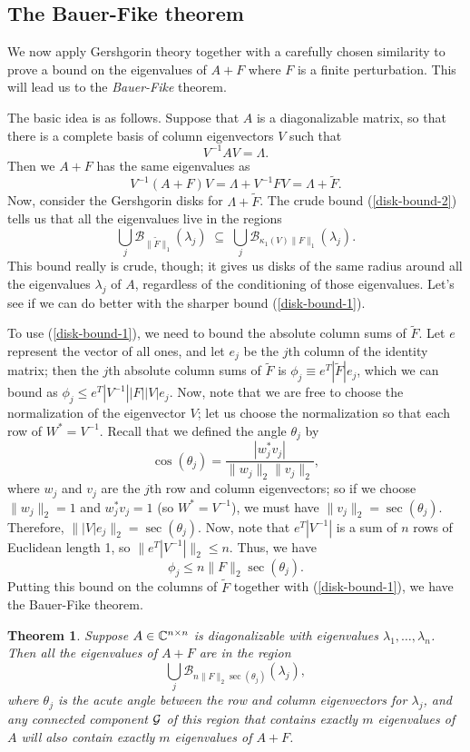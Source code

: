 \documentclass[12pt, leqno]{article} %
\newcommand{\calB}{\mathcal{B}}
\newtheorem{theorem}{Theorem}
\begin{document}
\subsection{The Bauer-Fike theorem}

We now apply Gershgorin theory together with a carefully chosen
similarity to prove a bound on the eigenvalues of $A+F$ where $F$ is a
finite perturbation.  This will lead us to the {\em Bauer-Fike} theorem.

The basic idea is as follows.  Suppose that $A$ is a diagonalizable matrix, so
that there is a complete basis of column eigenvectors $V$ such that
\[
  V^{-1} A V = \Lambda.
\]
Then we $A+F$ has the same eigenvalues as
\[
  V^{-1} (A+F) V = \Lambda + V^{-1} F V = \Lambda + \tilde{F}.
\]
Now, consider the Gershgorin disks for $\Lambda + \tilde{F}$.
The crude bound (\ref{disk-bound-2}) tells us
that all the eigenvalues live in the regions
\[
  \bigcup_j \calB_{\|\tilde{F}\|_1}(\lambda_j) \; \subseteq \;
  \bigcup_j \calB_{\kappa_1(V) \|F\|_1}(\lambda_j).
\]
This bound really is crude, though; it gives us disks of the
same radius around all the eigenvalues $\lambda_j$ of $A$,
regardless of the conditioning of those eigenvalues.  Let's
see if we can do better with the sharper bound (\ref{disk-bound-1}).

To use (\ref{disk-bound-1}), we need to bound
the absolute column sums of $\tilde{F}$.  Let $e$ represent
the vector of all ones, and let $e_j$ be the $j$th column of
the identity matrix; then the $j$th absolute column sums of $\tilde{F}$
is $\phi_j \equiv e^T |\tilde{F}| e_j$, which we can bound
as $\phi_j \leq e^T |V^{-1}| |F| |V| e_j$.  Now, note that we
are free to choose the normalization of the eigenvector $V$;
let us choose the normalization so that each row of $W^* = V^{-1}$.
Recall that we defined the angle $\theta_j$ by
\[
  \cos(\theta_j) = \frac{|w_j^* v_j|}{\|w_j\|_2 \|v_j\|_2},
\]
where $w_j$ and $v_j$ are the $j$th row and column eigenvectors;
so if we choose $\|w_j\|_2 = 1$ and $w_j^* v_j = 1$ (so $W^* = V^{-1}$),
we must have $\|v_j\|_2 = \sec(\theta_j)$.  Therefore,
$\||V| e_j\|_2 = \sec(\theta_j)$.  Now, note that $e^T |V^{-1}|$ is
a sum of $n$ rows of Euclidean length 1, so $\|e^T |V^{-1}|\|_2 \leq n$.
Thus, we have
\[
  \phi_j \leq n \|F\|_2 \sec(\theta_j).
\]
Putting this bound on the columns of $\tilde{F}$ together with
(\ref{disk-bound-1}), we have the Bauer-Fike theorem.

\begin{theorem}
  Suppose $A \in \mathbb{C}^{n \times n}$ is diagonalizable with
  eigenvalues $\lambda_1, \ldots, \lambda_n$.
  Then all the eigenvalues of $A+F$ are in the region
  \[
    \bigcup_j \calB_{n \|F\|_2 \sec(\theta_j)}(\lambda_j),
  \]
  where $\theta_j$ is the acute angle between the row and column eigenvectors
  for $\lambda_j$, and any connected component $\mathcal{G}$ of this region that
  contains exactly $m$ eigenvalues of $A$ will also contain exactly $m$
  eigenvalues of $A+F$.
\end{theorem}
\end{document}
